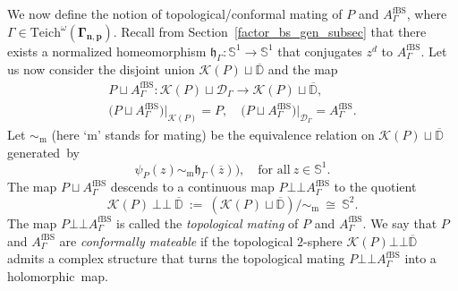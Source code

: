 \documentclass[JEP,XML,SOM,Unicode,NoFloatCountersInSection,published]{cedram}
\theoremstyle{definition}
\theoremstyle{remark}
\newcommand{\D}{\mathbb{D}}
\newcommand{\mate}{\bot \!\! \! {\bot}}
\begin{document}
We now define the notion of topological/conformal mating of $P$ and $A_{\Gamma}^{\mathrm{fBS}}$, where $\Gamma\in\mathrm{Teich}^\omega(\pmb{\Gamma_{n,p}})$.
Recall from Section~\ref{factor_bs_gen_subsec} that there exists a normalized homeomorphism $\mathfrak{h}_\Gamma:\mathbb{S}^1\to\mathbb{S}^1$ that conjugates $z^d$ to $A_{\Gamma}^{\mathrm{fBS}}$.
Let us now consider the disjoint union $\mathcal{K}(P)\sqcup \overline{\D}$ and the map\vspace*{-3pt}
\begin{gather*}
P\sqcup A_{\Gamma}^{\mathrm{fBS}}: \mathcal{K}(P)\sqcup \mathcal{D}_{\Gamma}\to \mathcal{K}(P)\sqcup \overline{\D},\\
\bigl(P\sqcup A_{\Gamma}^{\mathrm{fBS}}\bigr)\vert_{\mathcal{K}(P)}=P,\quad \bigl(P\sqcup A_{\Gamma}^{\mathrm{fBS}}\bigr)\vert_{\mathcal{D}_{\Gamma}}=A_{\Gamma}^{\mathrm{fBS}}.
\end{gather*}
Let $\sim_{\mathrm{m}}$ (here `m' stands for mating) be the equivalence relation on $\mathcal{K}(P)\sqcup \overline{\D}$ generated~by\vspace*{-3pt}
\begin{equation}
\psi_{P}(z)\sim_{\mathrm{m}} \mathfrak{h}_\Gamma(\overline{z})),\quad \text{for all}\ z\in\mathbb{S}^1.
\label{conf_mat_equiv_rel}
\end{equation}
The map $P\sqcup A_{\Gamma}^{\mathrm{fBS}}$ descends to a continuous map $P\mate A_{\Gamma}^{\mathrm{fBS}}$ to the quotient\vspace*{-3pt}
\[
\mathcal{K}(P)\ \mate\ \overline{\D}\ :=\ \left(\mathcal{K}(P)\sqcup \overline{\D}\right)/\sim_{\mathrm{m}}\ \cong\ \mathbb{S}^2.
\]
The map $P\mate A_{\Gamma}^{\mathrm{fBS}}$ is called the \emph{topological mating} of $P$ and $A_{\Gamma}^{\mathrm{fBS}}$.
We say that $P$ and $A_{\Gamma}^{\mathrm{fBS}}$ are \emph{conformally mateable} if the topological $2$-sphere $\mathcal{K}(P)\mate \overline{\D}$ admits a complex structure that turns the topological mating $P\mate A_{\Gamma}^{\mathrm{fBS}}$ into a holomorphic~map.
\end{document}
